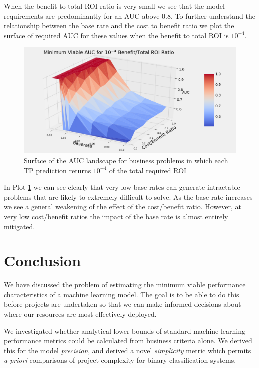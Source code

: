 \documentclass[11pt,a4paper]{article}
\begin{document}
When the benefit to total ROI ratio is very small we see that the model requirements are predominantly
for an AUC above $0.8$. To further understand the relationship between the base rate and the cost to benefit ratio
we plot the surface of required AUC for these values when the benefit to total ROI is $10^{-4}$.

\begin{figure}[h!]
\includegraphics[scale=0.5]{images/Baserate_vs_Cost_to_Benefit.png}
\caption{Surface of the AUC landscape for business problems in which each TP prediction returns
$10^{-4}$ of the total required ROI}
\label{fig:CBRatio}
\end{figure}

In Plot \ref{fig:CBRatio} we can see clearly that very low base rates can generate intractable problems that
are likely to extremely difficult to solve. As the base rate increases we see a general weakening of the
effect of the cost/benefit ratio. However, at very low cost/benefit ratios the impact of the base rate
is almost entirely mitigated.


\section{Conclusion}

We have discussed the problem of estimating the minimum viable performance characteristics
of a machine learning model. The goal is to be able to do this before projects are
undertaken so that we can make informed decisions about where our resources are
most effectively deployed.

We investigated whether analytical lower bounds of standard machine learning performance metrics could be calculated
from business criteria alone. We derived this for the model \textit{precision}, and derived a novel \textit{simplicity}
metric which permits \textit{a priori} comparisons of project complexity for binary classification systems.
\end{document}
